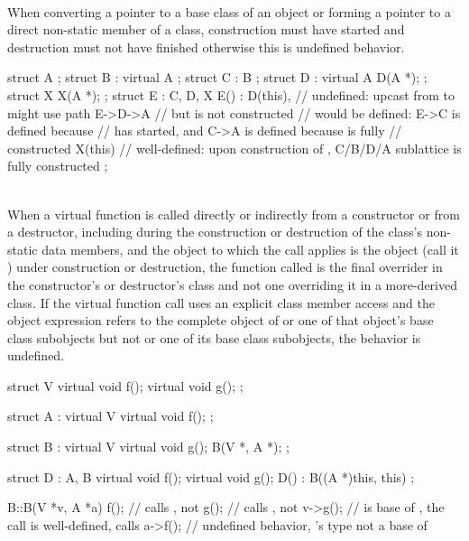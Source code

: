\pnum
{} \\
When converting a pointer to a base class of an object or forming a pointer to a direct non-static
member of a class, construction must have started and destruction must not have finished otherwise
this is undefined behavior.

\pnum
\begin{example}
\begin{codeblock}
struct A {};
struct B : virtual A {};
struct C : B {};
struct D : virtual A {
  D(A *);
};
struct X {
  X(A *);
};
struct E : C, D, X {
  E()
      : D(this),        // undefined: upcast from  to  might use path E->D->A
                        // but  is not constructed
                        //  would be defined: E->C is defined because
                        //  has started, and C->A is defined because  is fully
                        // constructed
        X(this)         // well-defined: upon construction of , C/B/D/A sublattice is fully constructed
  {}
};
\end{codeblock}
\end{example}

\pnum
{} \\
When a virtual function is called directly or indirectly from a constructor or from a destructor,
including during the construction or destruction of the class's non-static data members, and the object to
which the call applies is the object (call it ) under construction or destruction, the function called is the
final overrider in the constructor's or destructor's class and not one overriding it in a more-derived class.
If the virtual function call uses an explicit class member access  and the object expression refers
to the complete object of  or one of that object's base class subobjects but not  or one of its base class
subobjects, the behavior is undefined.

\pnum
\begin{example}
\begin{codeblock}
struct V {
  virtual void f();
  virtual void g();
};

struct A : virtual V {
  virtual void f();
};

struct B : virtual V {
  virtual void g();
  B(V *, A *);
};

struct D : A, B {
  virtual void f();
  virtual void g();
  D() : B((A *)this, this) {}
};

B::B(V *v, A *a) {
  f();          // calls , not 
  g();          // calls , not 
  v->g();       //  is base of , the call is well-defined, calls 
  a->f();       // undefined behavior, 's type not a base of 
}
\end{codeblock}
\end{example}


